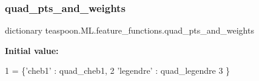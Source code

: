 \subsubsection{\texorpdfstring{quad\+\_\+pts\+\_\+and\+\_\+weights}{quad\_pts\_and\_weights}}
{\footnotesize\ttfamily dictionary teaspoon.\+M\+L.\+feature\+\_\+functions.\+quad\+\_\+pts\+\_\+and\+\_\+weights}

{\bfseries Initial value\+:}
\begin{DoxyCode}
1 =  \{\textcolor{stringliteral}{'cheb1'} : quad\_cheb1,
2            \textcolor{stringliteral}{'legendre'} : quad\_legendre
3            \}
\end{DoxyCode}
